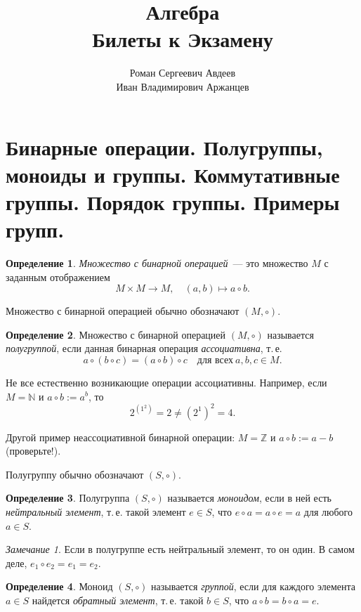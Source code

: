 \documentclass[a4paper, 12pt]{article}
\date{}
\date{}
\def\ZZ{{\mathbb Z}}%
\def\NN{{\mathbb N}}%
\theoremstyle{definition}
\newtheorem{definition}{Определение}
\theoremstyle{remark}
\newtheorem{remark}{Замечание}
\begin{document}
\title{\Huge{Алгебра \\ Билеты к Экзамену}}
\author{Роман Сергеевич Авдеев \\ Иван Владимирович Аржанцев}

\maketitle

\tableofcontents

\newpage

\section{Бинарные операции. Полугруппы, моноиды и группы. Коммутативные группы. Порядок группы. Примеры групп.}

\begin{definition}
{\it Множество с бинарной операцией}~--- это множество $M$ с
заданным отображением
$$
M\times M \to M, \quad (a,b) \mapsto a\circ b.
$$
\end{definition}

Множество с бинарной операцией обычно обозначают $(M,\circ)$.

\begin{definition}
Множество с бинарной операцией $(M,\circ)$ называется {\it
полугруппой}, если данная бинарная операция {\it ассоциативна},
т.\,е.
$$
a\circ (b \circ c) = (a\circ b)\circ c \quad \text{для всех} \ a,b,c\in M.
$$
\end{definition}

Не все естественно возникающие операции ассоциативны. Например, если
$M=\NN$ и $a\circ b:=a^b$, то
$$
2^{\left(1^2\right)}=2\ne (2^1)^2=4.
$$

Другой пример неассоциативной бинарной операции: $M = \ZZ$ и $a
\circ b := a - b$ (проверьте!).

Полугруппу обычно обозначают $(S,\circ)$.

\begin{definition}
Полугруппа $(S,\circ)$ называется {\it моноидом}, если в ней есть
{\it нейтральный элемент}, т.\,е. такой элемент $e\in S$, что
$e\circ a=a\circ e=a$ для любого $a\in S$.
\end{definition}

\begin{remark}
Если в полугруппе есть нейтральный элемент, то он один. В самом
деле, $e_1\circ e_2=e_1=e_2$.
\end{remark}

\begin{definition}
Моноид $(S,\circ)$ называется {\it группой}, если для каждого
элемента $a\in S$ найдется {\it обратный элемент}, т.\,е. такой
$b\in S$, что $a\circ b = b\circ a= e$.
\end{definition}
\end{document}
